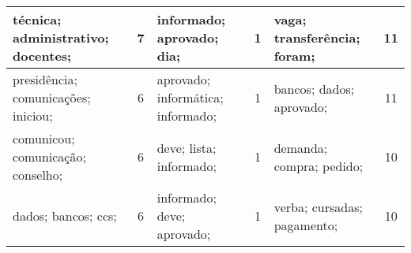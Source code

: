 \begin{table}[!h]
\begin{tabular}{|l|c||l|c||l|c|}
   técnica; administrativo; docentes; &   7  &         informado; aprovado; dia; &   1  &       vaga; transferência; foram; &   11  \\ \hline
   presidência; comunicações; iniciou; &   6  &         aprovado; informática; informado; &   1  &       bancos; dados; aprovado; &   11  \\ \hline
   comunicou; comunicação; conselho; &   6  &         deve; lista; informado; &   1  &       demanda; compra; pedido; &   10  \\ \hline
   dados; bancos; ccs; &   6  &         informado; deve; aprovado; &   1  &       verba; cursadas; pagamento; &   10  \\ \hline

\end{tabular}
\end{table}
